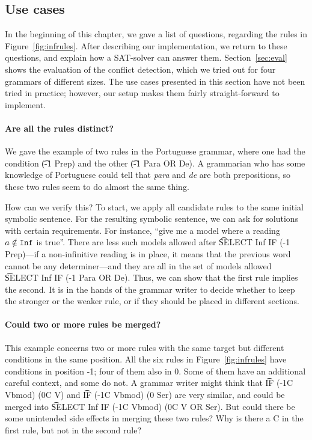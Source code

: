 {{\subsection{Use cases}

In the beginning of this chapter, we gave a list of questions, regarding the rules in Figure~\ref{fig:infrules}. After describing our implementation, we return to these questions, and explain how a SAT-solver can answer them. 
Section~\ref{sec:eval} shows the evaluation of the conflict detection, which we tried out for four grammars of different sizes. 
The use cases presented in this section have not been tried in practice; however, our setup makes them fairly straight-forward to implement.

\paragraph{Are all the rules distinct?} We gave the example of two rules in the Portuguese grammar, where one had the condition \t{(-1 Prep)} and the other \t{(-1 Para OR De)}. A grammarian who has some knowledge of Portuguese could tell that {\em para} and {\em de} are both prepositions, so these two rules seem to do almost the same thing.

How can we verify this? To start, we apply all candidate rules to the same initial symbolic sentence. For the resulting symbolic sentence, we can ask for solutions with certain requirements.
For instance, ``give me a model where a reading $a \notin \texttt{Inf}$ is true''.
There are less such models allowed after \t{SELECT Inf IF (-1 Prep)}---if 
a non-infinitive reading is in place, it means that the previous word cannot be any determiner---and 
they are all in the set of models allowed \t{SELECT Inf IF (-1 Para OR De)}. Thus, we can show that the first rule implies the second. It is in the hands of the grammar writer to decide whether to keep the stronger or the weaker rule, or if they should be placed in different sections.


\paragraph{Could two or more rules be merged?} This example concerns two or more rules with the same target but different conditions in the same position. 
All the six rules in Figure~\ref{fig:infrules} have conditions in position -1; four of them also in 0. Some of them have an additional careful context, and some do not.
A grammar writer might think that \t{IF (-1C Vbmod) (0C V)} and \t{IF (-1C Vbmod) (0 Ser)} are very similar, and could be merged into \t{SELECT Inf IF (-1C Vbmod) (0C V OR Ser)}. But could there be some unintended side effects in merging these two rules? Why is there a C in the first rule, but not in the second rule? 

}}
